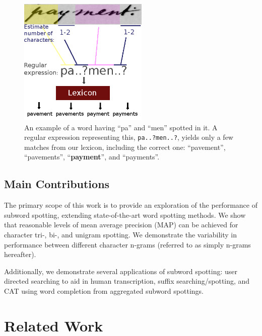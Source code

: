 \documentclass[ms,electronic,twosidetoc,letterpaper,chaptercenter,parttop,lol,lof,lot]{byumsphd}
\begin{document}
\begin{figure}
    \centering
    \includegraphics[width=0.55\textwidth]{spotting_completion_payment}
    \caption{An example of a word having ``pa'' and ``men'' spotted in it. A regular expression representing this, \texttt{pa..?men..?}, yields only a few matches from our lexicon, including the correct one: ``pavement'', ``pavements'', ``\textbf{payment}'', and ``payments''.}
    \label{fig:subtransexample}
\end{figure}


\section{Main Contributions}

The primary scope of this work is to provide an exploration of the performance of subword spotting, extending state-of-the-art word spotting methods.
We show that reasonable levels of mean average precision (MAP) can be achieved for character tri-, bi-, and unigram spotting. We demonstrate the variability in performance between different character n-grams (referred to as simply n-grams hereafter).

Additionally, we demonstrate several applications of subword spotting: user directed searching to aid in human transcription, suffix searching/spotting, and CAT using word completion from aggregated subword spottings.

\chapter{Related Work}\label{relatedwork}
\end{document}
